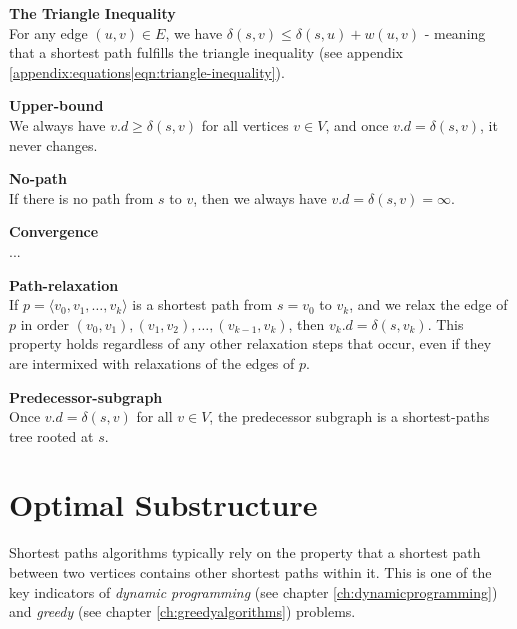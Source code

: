 \begin{description}
	\item \textbf{The Triangle Inequality} \cite[p.~671, thm. 24.10]{clrs} \\
For any edge $(u, v) \in E$, we have $\delta(s, v) \leq \delta(s, u) +
w(u, v)$ - meaning that a shortest path fulfills the triangle inequality (see
appendix \ref{appendix:equations|eqn:triangle-inequality}).

	\item \textbf{Upper-bound} \cite[p.~671-672, thm. 24.11]{clrs} \\
We always have $v.d \geq \delta(s, v)$ for all vertices $v \in V$, and once
$v.d = \delta(s, v)$, it never changes.

	\item \textbf{No-path} \cite[p.~672, thm. 24.12]{clrs} \\
If there is no path from $s$ to $v$, then we always have $v.d = \delta(s, v) =
\infty$.

	\item \textbf{Convergence} \cite[p.~672-673, thm. 24.14]{clrs} \\
...
	\item \textbf{Path-relaxation} \cite[p.~673, thm. 24.15]{clrs} \\
If $p = \langle v_0, v_1, \dots, v_k \rangle$ is a shortest path from
$s = v_0$ to $v_k$, and we relax the edge of $p$ in order $(v_0, v_1),
(v_1, v_2), \dots, (v_{k-1}, v_k)$, then $v_k.d = \delta(s, v_k)$. This
property holds regardless of any other relaxation steps that occur, even if
they are intermixed with relaxations of the edges of $p$.
	\item \textbf{Predecessor-subgraph} \cite[p.~676, thm. 24.17]{clrs} \\
Once $v.d = \delta(s, v)$ for all $v \in V$, the predecessor subgraph is a
shortest-paths tree rooted at $s$.
\end{description}

\newpage
\section{Optimal Substructure}
Shortest paths algorithms typically rely on the property that a shortest path
between two vertices contains other shortest paths within it. This is one of
the key indicators of \textit{dynamic programming} (see chapter
\ref{ch:dynamicprogramming}) and \textit{greedy} (see chapter
\ref{ch:greedyalgorithms}) problems.

